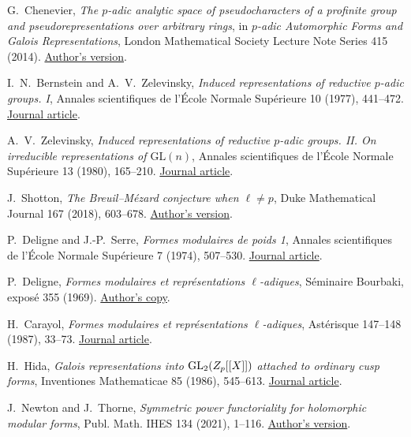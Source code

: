G.~Chenevier,
\emph{The \(p\)-adic analytic space of pseudocharacters of a profinite
group and pseudorepresentations over arbitrary rings},
in \emph{\(p\)-adic Automorphic Forms and Galois Representations},
London Mathematical Society Lecture Note Series 415 (2014).
\href{https://gaetan.chenevier.perso.math.cnrs.fr/articles/determinants.pdf}{Author's version}.

I.~N.~Bernstein and A.~V.~Zelevinsky,
\emph{Induced representations of reductive \(p\)-adic groups. I},
Annales scientifiques de l'\'Ecole Normale Sup\'erieure 10 (1977),
441--472.
\href{https://www.numdam.org/articles/10.24033/asens.1333/}{Journal article}.

A.~V.~Zelevinsky,
\emph{Induced representations of reductive \(p\)-adic groups. II.
On irreducible representations of \(\mathrm{GL}(n)\)},
Annales scientifiques de l'\'Ecole Normale Sup\'erieure 13 (1980),
165--210.
\href{https://www.numdam.org/articles/10.24033/asens.1379/}{Journal article}.

J.~Shotton,
\emph{The Breuil--M\'ezard conjecture when \(\ell\ne p\)},
Duke Mathematical Journal 167 (2018), 603--678.
\href{https://arxiv.org/abs/1608.01784}{Author's version}.

P.~Deligne and J.-P.~Serre,
\emph{Formes modulaires de poids 1},
Annales scientifiques de l'\'Ecole Normale Sup\'erieure
7 (1974), 507--530.
\href{https://www.numdam.org/item/ASENS_1974_4_7_4_507_0/}{Journal article}.

P.~Deligne, \emph{Formes modulaires et repr\'esentations
\(\ell\)-adiques}, S\'eminaire Bourbaki, expos\'e 355 (1969).
\href{https://publications.ias.edu/deligne/paper/351}{Author's copy}.

H.~Carayol, \emph{Formes modulaires et repr\'esentations
\(\ell\)-adiques}, Ast\'erisque 147--148 (1987), 33--73.
\href{https://www.numdam.org/item/AST_1987__147-148__33_0/}{Journal article}.

H.~Hida, \emph{Galois representations into
\(\mathrm{GL}_2(Z_p[[X]])\) attached to ordinary cusp forms},
Inventiones Mathematicae 85 (1986), 545--613.
\href{https://doi.org/10.1007/BF01390329}{Journal article}.

J.~Newton and J.~Thorne,
\emph{Symmetric power functoriality for holomorphic modular forms},
Publ. Math. IHES 134 (2021), 1--116.
\href{https://arxiv.org/abs/1912.11261}{Author's version}.

